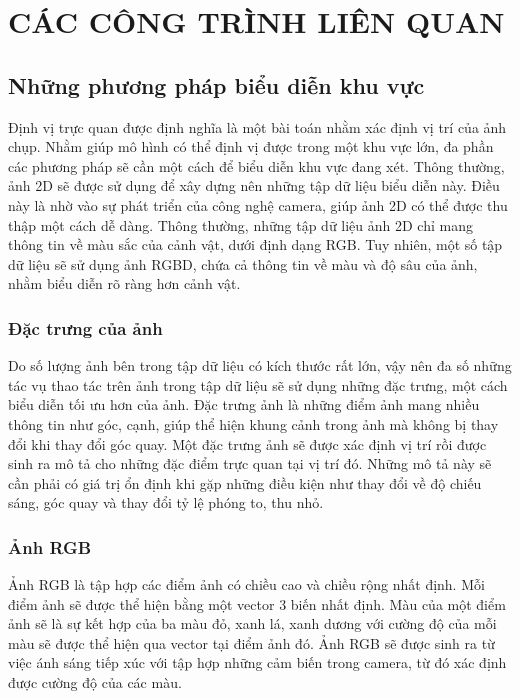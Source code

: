 \chapter{CÁC CÔNG TRÌNH LIÊN QUAN}

\section{Những phương pháp biểu diễn khu vực}

Định vị trực quan được định nghĩa là một bài toán nhằm xác định vị trí của ảnh chụp. Nhằm giúp mô hình có thể định vị được trong một khu vực lớn, đa phần các phương pháp sẽ cần một cách để biểu diễn khu vực đang xét. Thông thường, ảnh 2D sẽ được sử dụng để xây dựng nên những tập dữ liệu biểu diễn này. Điều này là nhờ vào sự phát triển của công nghệ camera, giúp ảnh 2D có thể được thu thập một cách dễ dàng. Thông thường, những tập dữ liệu ảnh 2D chỉ mang thông tin về màu sắc của cảnh vật, dưới định dạng RGB. Tuy nhiên, một số tập dữ liệu sẽ sử dụng ảnh RGBD, chứa cả thông tin về màu và độ sâu của ảnh, nhằm biểu diễn rõ ràng hơn cảnh vật. 

\subsection{Đặc trưng của ảnh}

Do số lượng ảnh bên trong tập dữ liệu có kích thước rất lớn, vậy nên đa số những tác vụ thao tác trên ảnh trong tập dữ liệu sẽ sử dụng những đặc trưng, một cách biểu diễn tối ưu hơn của ảnh. Đặc trưng ảnh là những điểm ảnh mang nhiều thông tin như góc, cạnh, giúp thể hiện khung cảnh trong ảnh mà không bị thay đổi khi thay đổi góc quay. Một đặc trưng ảnh sẽ được xác định vị trí rồi được sinh ra mô tả cho những đặc điểm trực quan tại vị trí đó. Những mô tả này sẽ cần phải có giá trị ổn định khi gặp những điều kiện như thay đổi về độ chiếu sáng, góc quay và thay đổi tỷ lệ phóng to, thu nhỏ.

\subsection{Ảnh RGB}

Ảnh RGB là tập hợp các điểm ảnh có chiều cao và chiều rộng nhất định. Mỗi điểm ảnh sẽ được thể hiện bằng một vector 3 biến nhất định. Màu của một điểm ảnh sẽ là sự kết hợp của ba màu đỏ, xanh lá, xanh dương với cường độ của mỗi màu sẽ được thể hiện qua vector tại điểm ảnh đó. Ảnh RGB sẽ được sinh ra từ việc ánh sáng tiếp xúc với tập hợp những cảm biến trong camera, từ đó xác định được cường độ của các màu.

